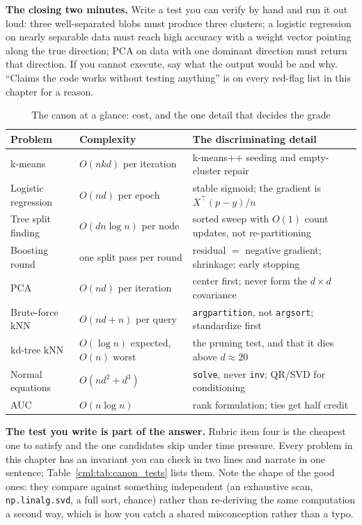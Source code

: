 \textbf{The closing two minutes.} Write a test you can verify by hand and run it out loud: three well-separated blobs must produce three clusters; a logistic regression on nearly separable data must reach high accuracy with a weight vector pointing along the true direction; PCA on data with one dominant direction must return that direction. If you cannot execute, say what the output would be and why. ``Claims the code works without testing anything'' is on every red-flag list in this chapter for a reason.

\begin{table}[H]\centering
\caption{The canon at a glance: cost, and the one detail that decides the grade}
\label{cml:tab:canon_glance}
\small
\begin{tabular}{p{3.0cm}p{3.0cm}p{7.6cm}}
\toprule
\textbf{Problem} & \textbf{Complexity} & \textbf{The discriminating detail} \\
\midrule
k-means & $O(nkd)$ per iteration & k-means++ seeding and empty-cluster repair \\
Logistic regression & $O(nd)$ per epoch & stable sigmoid; the gradient is $X^\top(p-y)/n$ \\
Tree split finding & $O(dn\log n)$ per node & sorted sweep with $O(1)$ count updates, not re-partitioning \\
Boosting round & one split pass per round & residual $=$ negative gradient; shrinkage; early stopping \\
PCA & $O(nd)$ per iteration & center first; never form the $d \times d$ covariance \\
Brute-force kNN & $O(nd + n)$ per query & \texttt{argpartition}, not \texttt{argsort}; standardize first \\
kd-tree kNN & $O(\log n)$ expected, $O(n)$ worst & the pruning test, and that it dies above $d \approx 20$ \\
Normal equations & $O(nd^2 + d^3)$ & \texttt{solve}, never \texttt{inv}; QR/SVD for conditioning \\
AUC & $O(n\log n)$ & rank formulation; ties get half credit \\
\bottomrule
\end{tabular}
\end{table}

\textbf{The test you write is part of the answer.} Rubric item four is the cheapest one to satisfy and the one candidates skip under time pressure. Every problem in this chapter has an invariant you can check in two lines and narrate in one sentence; Table~\ref{cml:tab:canon_tests} lists them. Note the shape of the good ones: they compare against something independent (an exhaustive scan, \texttt{np.linalg.svd}, a full sort, chance) rather than re-deriving the same computation a second way, which is how you catch a shared misconception rather than a typo.

